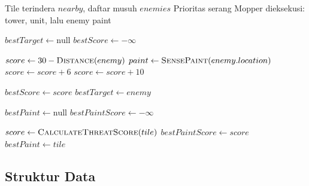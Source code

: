 \begin{breakablealgorithm}
	\caption{Greedy Mopping and Steal Paint pada MopperBot}
	\label{alg:alt1-mopper-exec}
	\begin{algorithmic}[1]
		\Require Tile terindera $nearby$, daftar musuh $enemies$
		\Ensure Prioritas serang Mopper dieksekusi: tower, unit, lalu enemy paint
		\State {}
		\State \Return
		\EndIf

		\State $bestTarget \gets \text{null}$
		\State $bestScore \gets -\infty$

		\State $score \gets 30 - \Call{Distance}{enemy}$
		\State $paint \gets \Call{SensePaint}{enemy.location}$
		\State $score \gets score + 6$
		\State $score \gets score + 10$
		\EndIf

		\State $bestScore \gets score$
		\State $bestTarget \gets enemy$
		\EndIf
		\EndFor

		\State {}
		\State \Return
		\EndIf

		\State $bestPaint \gets \text{null}$
		\State $bestPaintScore \gets -\infty$

		\State $score \gets \Call{CalculateThreatScore}{tile}$
		\State $bestPaintScore \gets score$
		\State $bestPaint \gets tile$
		\EndIf
		\EndFor

		\State {}
		\EndIf
		\EndFunction
	\end{algorithmic}
\end{breakablealgorithm}


\newpage
\subsection{Struktur Data}

